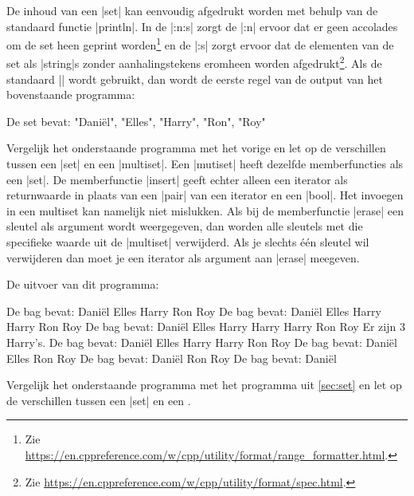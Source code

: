 \begin{cpplstShortInline}
De inhoud van een |set| kan eenvoudig afgedrukt worden met behulp van de standaard functie |println|.
In de  |{:n:s}| zorgt de |:n| ervoor dat er geen accolades om de set heen geprint worden\footnote{%
	Zie \url{https://en.cppreference.com/w/cpp/utility/format/range_formatter.html}.
} en de |:s| zorgt ervoor dat de elementen van de set als |string|s zonder aanhalingstekens eromheen worden afgedrukt\footnote{%
	Zie \url{https://en.cppreference.com/w/cpp/utility/format/spec.html}.
}.
Als de standaard  |{}| wordt gebruikt, dan wordt de eerste regel van de output van het bovenstaande programma:
\begin{coutput}
De set bevat: {"Daniël", "Elles", "Harry", "Ron", "Roy"}
\end{coutput}

Vergelijk het onderstaande programma  met het vorige en let op de verschillen tussen een |set| en een |multiset|.
Een |mutiset| heeft dezelfde memberfuncties als een |set|.
De memberfunctie |insert| geeft echter alleen een iterator als returnwaarde in plaats van een |pair| van een iterator en een |bool|.
Het invoegen in een multiset kan namelijk niet mislukken.
Als bij de memberfunctie |erase| een sleutel als argument wordt weergegeven, dan worden alle sleutels met die specifieke waarde uit de |multiset| verwijderd.
Als je slechts één sleutel wil verwijderen dan moet je een iterator als argument aan |erase| meegeven.

De uitvoer van dit programma:
\begin{coutput}
De bag bevat: Daniël Elles Harry Ron Roy
De bag bevat: Daniël Elles Harry Harry Ron Roy
De bag bevat: Daniël Elles Harry Harry Harry Ron Roy
Er zijn 3 Harry's.
De bag bevat: Daniël Elles Harry Harry Ron Roy
De bag bevat: Daniël Elles Ron Roy
De bag bevat: Daniël Ron Roy
De bag bevat: Daniël
\end{coutput}

Vergelijk het onderstaande programma  met het programma uit \cref{sec:set} en let op de verschillen tussen een |set| en een .



\end{cpplstShortInline}
